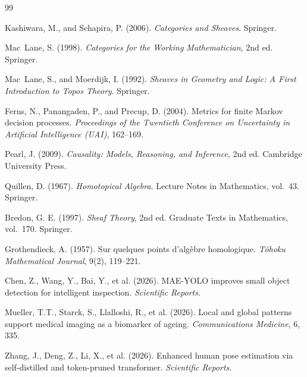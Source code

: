 \documentclass[11pt, a4paper]{article}
\theoremstyle{plain}
\theoremstyle{definition}
\theoremstyle{remark}
\begin{document}
\bigskip
\begin{thebibliography}{99}

Kashiwara, M., and Schapira, P. (2006).
\textit{Categories and Sheaves}.
Springer.

Mac~Lane, S. (1998).
\textit{Categories for the Working Mathematician}, 2nd ed.
Springer.

Mac~Lane, S., and Moerdijk, I. (1992).
\textit{Sheaves in Geometry and Logic: A First Introduction to Topos Theory}.
Springer.

Ferns, N., Panangaden, P., and Precup, D. (2004).
Metrics for finite Markov decision processes.
\textit{Proceedings of the Twentieth Conference on Uncertainty in
Artificial Intelligence (UAI)}, 162--169.

Pearl, J. (2009).
\textit{Causality: Models, Reasoning, and Inference}, 2nd ed.
Cambridge University Press.

Quillen, D. (1967).
\textit{Homotopical Algebra}.
Lecture Notes in Mathematics, vol.\ 43.
Springer.

Bredon, G. E. (1997).
\textit{Sheaf Theory}, 2nd ed.
Graduate Texts in Mathematics, vol.\ 170.
Springer.

Grothendieck, A. (1957).
Sur quelques points d'alg\`ebre homologique.
\textit{T\^ohoku Mathematical Journal}, 9(2), 119--221.

Chen, Z., Wang, Y., Bai, Y., et al. (2026).
MAE-YOLO improves small object detection for intelligent inspection.
\textit{Scientific Reports}.

Mueller, T.T., Starck, S., Llalloshi, R., et al. (2026).
Local and global patterns support medical imaging as a biomarker of ageing.
\textit{Communications Medicine}, 6, 335.

Zhang, J., Deng, Z., Li, X., et al. (2026).
Enhanced human pose estimation via self-distilled and token-pruned transformer.
\textit{Scientific Reports}.

\end{thebibliography}
\end{document}
